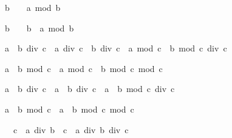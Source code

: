 \begin{isabellebody}
\begin{isamarkuptext}
\begin{isabelle}%
b\ {\isacharless}\ {}\ {\isasymLongrightarrow}\ a\ mod\ b\ {\isasymle}\ {}%
\end{isabelle}

\begin{isabelle}%
b\ {\isacharless}\ {}\ {\isasymLongrightarrow}\ b\ {\isacharless}\ a\ mod\ b%
\end{isabelle}

\begin{isabelle}%
{\isacharparenleft}a\ {\isacharplus}\ b{\isacharparenright}\ div\ c\ {\isacharequal}\ a\ div\ c\ {\isacharplus}\ b\ div\ c\ {\isacharplus}\ {\isacharparenleft}a\ mod\ c\ {\isacharplus}\ b\ mod\ c{\isacharparenright}\ div\ c%
\end{isabelle}

\begin{isabelle}%
{\isacharparenleft}a\ {\isacharplus}\ b{\isacharparenright}\ mod\ c\ {\isacharequal}\ {\isacharparenleft}a\ mod\ c\ {\isacharplus}\ b\ mod\ c{\isacharparenright}\ mod\ c%
\end{isabelle}

\begin{isabelle}%
a\ {\isacharasterisk}\ b\ div\ c\ {\isacharequal}\ a\ {\isacharasterisk}\ {\isacharparenleft}b\ div\ c{\isacharparenright}\ {\isacharplus}\ a\ {\isacharasterisk}\ {\isacharparenleft}b\ mod\ c{\isacharparenright}\ div\ c%
\end{isabelle}

\begin{isabelle}%
a\ {\isacharasterisk}\ b\ mod\ c\ {\isacharequal}\ a\ {\isacharasterisk}\ {\isacharparenleft}b\ mod\ c{\isacharparenright}\ mod\ c%
\end{isabelle}

\begin{isabelle}%
{}\ {\isacharless}\ c\ {\isasymLongrightarrow}\ a\ div\ {\isacharparenleft}b\ {\isacharasterisk}\ c{\isacharparenright}\ {\isacharequal}\ a\ div\ b\ div\ c%
\end{isabelle}


\end{isamarkuptext}
\end{isabellebody}
